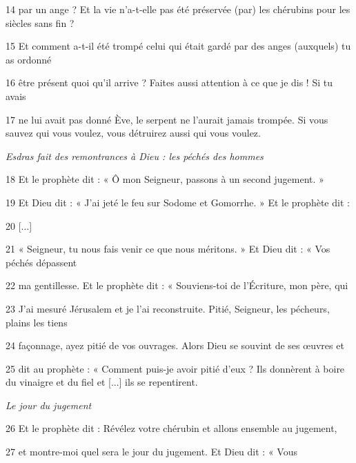 \par 14 par un ange ? Et la vie n'a-t-elle pas été préservée (par) les chérubins pour les siècles sans fin ?

\par 15 Et comment a-t-il été trompé celui qui était gardé par des anges (auxquels) tu as ordonné

\par 16 être présent quoi qu'il arrive ? Faites aussi attention à ce que je dis ! Si tu avais

\par 17 ne lui avait pas donné Ève, le serpent ne l'aurait jamais trompée. Si vous sauvez qui vous voulez, vous détruirez aussi qui vous voulez.

\par \textit{Esdras fait des remontrances à Dieu : les péchés des hommes}

\par 18 Et le prophète dit : « Ô mon Seigneur, passons à un second jugement. »

\par 19 Et Dieu dit : « J'ai jeté le feu sur Sodome et Gomorrhe. » Et le prophète dit :

\par 20 [...]

\par 21 « Seigneur, tu nous fais venir ce que nous méritons. » Et Dieu dit : « Vos péchés dépassent

\par 22 ma gentillesse. Et le prophète dit : « Souviens-toi de l’Écriture, mon père, qui

\par 23 J'ai mesuré Jérusalem et je l'ai reconstruite. Pitié, Seigneur, les pécheurs, plains les tiens

\par 24 façonnage, ayez pitié de vos ouvrages. Alors Dieu se souvint de ses œuvres et

\par 25 dit au prophète : « Comment puis-je avoir pitié d'eux ? Ils donnèrent à boire du vinaigre et du fiel et [...] ils se repentirent.

\par \textit{Le jour du jugement}

\par 26 Et le prophète dit : Révélez votre chérubin et allons ensemble au jugement,

\par 27 et montre-moi quel sera le jour du jugement. Et Dieu dit : « Vous

